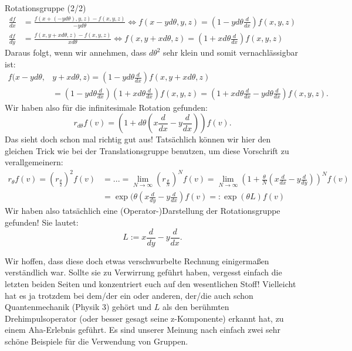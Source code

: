 \begin{Beispiel}{Rotationsgruppe (2/2)}
\begin{align*}
    \frac{df}{dx}&=\frac{f(x+(-yd\theta),y,z)-f(x,y,z)}{-yd\theta} \Leftrightarrow f(x-yd\theta,y,z)=(1-yd\theta\frac{d}{dx})f(x,y,z) \\
    \frac{df}{dy}&=\frac{f(x,y+xd\theta,z)-f(x,y,z)}{xd\theta} \Leftrightarrow f(x,y+xd\theta,z) = (1+xd\theta\frac{d}{dx})f(x,y,z)
\end{align*}
Daraus folgt, wenn wir annehmen, dass $d\theta^{2}$ sehr klein und somit vernachlässigbar ist:
\begin{align*}
    f(x-yd\theta,&y+xd\theta,z) = (1-yd\theta\frac{d}{dx})f(x,y+xd\theta,z)\\ &= (1-yd\theta\frac{d}{dx})(1+xd\theta\frac{d}{dx})f(x,y,z) = (1+xd\theta\frac{d}{dx}-yd\theta\frac{d}{dx})f(x,y,z).
\end{align*}
Wir haben also für die infinitesimale Rotation gefunden:
\begin{equation*}
    r_{d\theta}f(v)=(1+d\theta(x\frac{d}{dx}-y\frac{d}{dx}))f(v).
\end{equation*}
Das sieht doch schon mal richtig gut aus! Tatsächlich können wir hier den gleichen Trick wie bei der Translationsgruppe benutzen, um diese Vorschrift zu verallgemeinern:
\begin{align*}
    r_{\theta}f(v) = (r_{\frac{\theta}{2}})^{2}f(v)&=...=\lim_{N\rightarrow\infty}(r_{\frac{\theta}{N}})^{N}f(v)=\lim_{N\rightarrow\infty}(1+\frac{\theta}{N}(x\frac{d}{dx}-y\frac{d}{dy}))^{N}f(v)\\ &=\exp{(\theta(x\frac{d}{dy}-y\frac{d}{dx})}f(v) =: \exp{(\theta L)}f(v)
\end{align*}
Wir haben also tatsächlich eine (Operator-)Darstellung der Rotationsgruppe gefunden! Sie lautet:
\begin{equation*}
    L:=x\frac{d}{dy}-y\frac{d}{dx}.
\end{equation*}
\end{Beispiel}
Wir hoffen, dass diese doch etwas verschwurbelte Rechnung einigermaßen verständlich war. Sollte sie zu Verwirrung geführt haben, vergesst einfach die letzten beiden Seiten und konzentriert euch auf den wesentlichen Stoff! Vielleicht hat es ja trotzdem bei dem/der ein oder anderen, der/die auch schon Quantenmechanik (Physik 3) gehört und $L$ als den berühmten Drehimpulsoperator (oder besser gesagt seine z-Komponente) erkannt hat, zu einem Aha-Erlebnis geführt. Es sind unserer Meinung nach einfach zwei sehr schöne Beispiele für die Verwendung von Gruppen.

